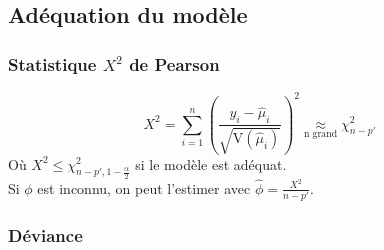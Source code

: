 \documentclass[10pt, french]{article}
\begin{document}
\begin{multicols*}{3}
\begin{itemize}
	
%	
%	
\end{itemize}

\subsection*{Adéquation du modèle}
\subsubsection*{Statistique $X^2$ de Pearson}
\begin{equation*}
	X^2 
	= 	\sum_{i = 1}^{n} \left( \frac{y_i -  \hat{\mu}_i}{\sqrt{\text{V}(\hat{\mu}_i)}} \right)^2   
	\underset{\text{n grand}}{\approx} \chi_{n-p'}^2 
\end{equation*}
Où $X^2 \leq \chi_{n-p', 1 - \frac{\alpha}{2}}^2$ si le modèle est adéquat.\\
Si $\phi$ est inconnu, on peut l'estimer avec $\hat{\phi} = \frac{X^2}{n-p'}$.

\subsubsection*{Déviance}


\end{multicols*}
\end{document}
